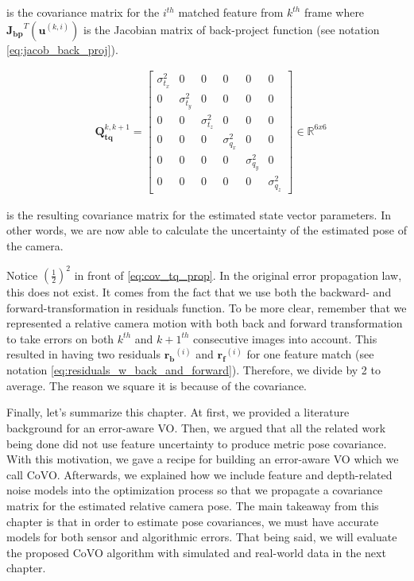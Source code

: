 \documentclass[a4paper]{report}
\numberwithin{figure}{section}
\newcommand{\R}{\mathbb{R}}
\begin{document}
is the covariance matrix for the $i^{th}$ matched feature from $k^{th}$ frame 
where $\mathbf{J_{bp}}^T(\mathbf{u}^{(k,i)})$ is the Jacobian matrix of 
back-project function (see notation \eqref{eq:jacob_back_proj}).

\begin{equation} \begin{aligned} & \mathbf{Q}_{\mathbf{tq}}^{k,k+1}  =
\begin{bmatrix} \sigma_{t_x}^2 & 0 & 0 & 0 & 0 & 0 \\ 0 & \sigma_{t_y}^2 & 0 &
0 & 0 & 0 \\ 0 & 0 & \sigma_{t_z}^2 & 0 & 0 & 0 \\ 0 & 0 & 0 & \sigma_{q_x}^2 &
0 & 0 \\ 0 & 0 & 0 & 0 & \sigma_{q_y}^2 & 0 \\ 0 & 0 & 0 & 0 & 0 &
\sigma_{q_z}^2 \end{bmatrix} \in \R^{6x6} \end{aligned} \end{equation}

is the resulting covariance matrix for the estimated state vector parameters.
In other words, we are now able to calculate the uncertainty of the estimated
pose of the camera.

Notice $(\frac{1}{2})^2$ in front of \eqref{eq:cov_tq_prop}.  In the original
error propagation law, this does not exist.  It comes from the fact that we use
both the backward- and forward-transformation in residuals function.  To be
more clear, remember that we represented a relative camera motion with both
back and forward transformation to take errors on both $k^{th}$ and $k+1^{th}$
consecutive images into account. This resulted in having two residuals
$\mathbf{r_b}^{(i)}$ and $\mathbf{r_f}^{(i)}$ for one feature match (see
notation \eqref{eq:residuals_w_back_and_forward}).  Therefore, we divide by 2 
to
average. The reason we square it is because of the covariance.

Finally, let's summarize this chapter. At first, we provided a literature
background for an error-aware VO. Then, we argued that all the related work being
done did not use feature uncertainty to produce metric pose covariance. With
this motivation, we gave a recipe for building an error-aware VO which we call
CoVO. Afterwards, we explained how we include feature and depth-related noise models
into the optimization process so that we propagate a covariance matrix for the
estimated relative camera pose. 
The main takeaway from this chapter is that in order to estimate 
pose covariances, we must have accurate models for both sensor and 
algorithmic errors. 
That being said, we will evaluate the
proposed CoVO algorithm with simulated and real-world data in the next chapter. 
\end{document}
